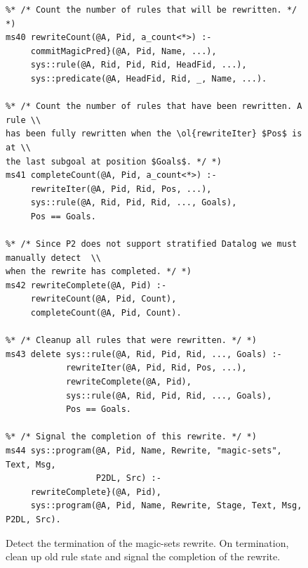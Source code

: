\begin{figure}[!t]
\ssp
\centering
\begin{lstlisting}
%* /* Count the number of rules that will be rewritten. */ *)
ms40 rewriteCount(@A, Pid, a_count<*>) :-
     commitMagicPred}(@A, Pid, Name, ...),
     sys::rule(@A, Rid, Pid, Rid, HeadFid, ...),
     sys::predicate(@A, HeadFid, Rid, _, Name, ...).
	
%* /* Count the number of rules that have been rewritten. A rule \\ 
has been fully rewritten when the \ol{rewriteIter} $Pos$ is at \\
the last subgoal at position $Goals$. */ *)
ms41 completeCount(@A, Pid, a_count<*>) :-
     rewriteIter(@A, Pid, Rid, Pos, ...),
     sys::rule(@A, Rid, Pid, Rid, ..., Goals),
     Pos == Goals.
	
%* /* Since P2 does not support stratified Datalog we must manually detect  \\
when the rewrite has completed. */ *)
ms42 rewriteComplete(@A, Pid) :- 
     rewriteCount(@A, Pid, Count),
     completeCount(@A, Pid, Count).

%* /* Cleanup all rules that were rewritten. */ *)
ms43 delete sys::rule(@A, Rid, Pid, Rid, ..., Goals) :-
            rewriteIter(@A, Pid, Rid, Pos, ...),
            rewriteComplete(@A, Pid),
            sys::rule(@A, Rid, Pid, Rid, ..., Goals),
            Pos == Goals.

%* /* Signal the completion of this rewrite. */ *)
ms44 sys::program(@A, Pid, Name, Rewrite, "magic-sets", Text, Msg, 
                  P2DL, Src) :-
     rewriteComplete}(@A, Pid),
     sys::program(@A, Pid, Name, Rewrite, Stage, Text, Msg, P2DL, Src).

\end{lstlisting}
\caption{\label{ch:magic:fig:rewrite10} Detect the termination of the magic-sets rewrite. 
On termination, clean up old rule state and signal the completion of the rewrite.}
\end{figure}

